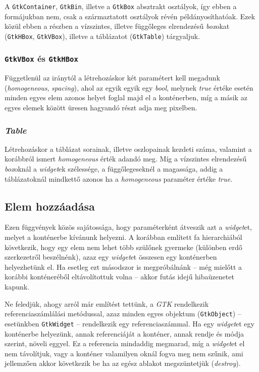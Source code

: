 A \texttt{GtkContainer}, \texttt{GtkBin}, illetve a \texttt{GtkBox} absztrakt osztályok, így ebben a formájukban nem, csak a származtatott osztályok révén példányosíthatóak. Ezek közül ebben a részben a vízszintes, illetve függőleges elrendezésű \textit{box}okat (\texttt{GtkHBox}, \texttt{GtkVBox}), illetve a táblázatot (\texttt{GtkTable}) tárgyaljuk.

\subsubsection{\texttt{GtkVBox} és \texttt{GtkHBox}}

Függetlenül az iránytól a létrehozáskor két paramétert kell megadunk (\textit{homogeneous}, \textit{spacing}), ahol az egyik egyik egy \textit{bool}, melynek \textit{true} értéke esetén minden egyes elem azonos helyet foglal majd el a konténerben, míg a másik az egyes elemek között üresen hagyandó részt adja meg pixelben.

\subsubsection{\textit{Table}}

Létrehozáskor a táblázat sorainak, illetve oszlopainak kezdeti száma, valamint a korábbról ismert \textit{homogeneous} érték adandó meg. Míg a vízszintes elrendezésű \textit{box}oknál a \textit{widget}ek szélessége, a függőlegeseknél a magassága, addig a táblázatoknál mindkettő azonos ha a \textit{homogeneous} paraméter értéke \textit{true}.

\subsection{Elem hozzáadása}

Ezen függvények közös sajátossága, hogy paraméterként átveszik azt a \textit{widget}et, melyet a konténerbe kívánunk helyezni. A korábban említett fa hierarchiából következik, hogy egy elem nem lehet több szülőnek gyermeke (különben erdő szerkezetről beszélnénk), azaz egy \textit{widget}et összesen egy konténerben helyezhetünk el. Ha esetleg ezt másodszor is megpróbálnánk -- még mielőtt a korábbi konténeréből eltávolítottuk volna -- akkor futás idejű hibaüzenetet kapunk.

Ne feledjük, ahogy arról már említést tettünk, a \textit{GTK} rendelkezik referenciaszámlálási metódussal, azaz minden egyes objektum (\texttt{GtkObject}) -- esetünkben \texttt{GtkWidget} -- rendelkezik egy referenciaszámmal. Ha egy \textit{widget}et egy konténerbe helyezünk, annak referenciáját a konténer, annak rendje és módja szerint, növeli eggyel. Ez a referencia mindaddig megmarad, míg a \textit{widget}et el nem távolítjuk, vagy a konténer valamilyen oknál fogva meg nem szűnik, ami jellemzően akkor következik be ha az egész ablakot megszüntetjük (\textit{destroy}).

